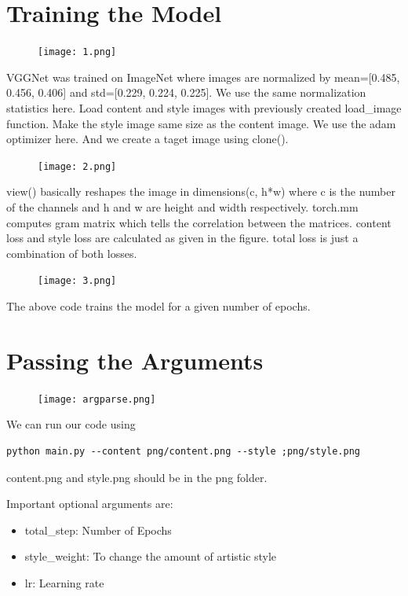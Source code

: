 \documentclass[oneside]{book}
\begin{document}
\section*{Training the Model}
\begin{figure}[H]
\centerline{\texttt{[image: 1.png]}}
\end{figure}
VGGNet was trained on ImageNet where images are normalized by mean=[0.485, 0.456, 0.406] and std=[0.229, 0.224, 0.225].
We use the same normalization statistics here.
Load content and style images with previously created load\_image function.
Make the style image same size as the content image.
We use the adam optimizer here. And we create a taget image using clone().
\begin{figure}[H]
\centerline{\texttt{[image: 2.png]}}
\end{figure}
view() basically reshapes the image in dimensions(c, h*w) where c is the number of the channels and h and w are height and width respectively.
torch.mm computes gram matrix which tells the correlation between the matrices.
content loss and style loss are calculated as given in the figure.
total loss is just a combination of both losses.
\begin{figure}[H]
\centerline{\texttt{[image: 3.png]}}
\end{figure}
The above code trains the model for a given number of epochs.
\pagebreak

\section*{Passing the Arguments}
\begin{figure}[H]
\centerline{\texttt{[image: argparse.png]}}
\end{figure}

We can run our code using 
\begin{lstlisting}
python main.py --content png/content.png --style ;png/style.png
\end{lstlisting}
content.png and style.png should be in the png folder.

Important optional arguments are:
\begin{itemize}
\item total\_step: Number of Epochs
\item style\_weight: To change the amount of artistic style
\item lr: Learning rate
\end{itemize}

\LARGE
\end{document}

